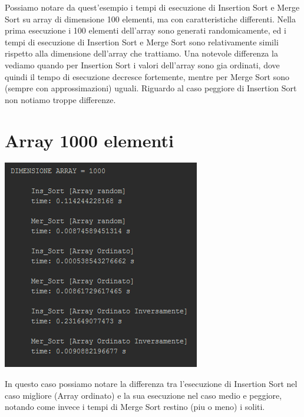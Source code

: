 \documentclass{article}
\begin{document}
Possiamo notare da quest'esempio i tempi di esecuzione di Insertion Sort e Merge Sort su array di dimensione 100 elementi, ma con caratteristiche differenti. Nella prima esecuzione i 100 elementi dell'array sono generati randomicamente, ed i tempi di esecuzione di Insertion Sort e Merge Sort sono relativamente simili rispetto alla dimensione dell'array che trattiamo. Una notevole differenza la vediamo quando per Insertion Sort i valori dell'array sono gia ordinati, dove quindi il tempo di esecuzione decresce fortemente, mentre per Merge Sort sono (sempre con approssimazioni) uguali. Riguardo al caso peggiore di Insertion Sort non notiamo troppe differenze.



\section{Array 1000 elementi}
\begin{center}
\includegraphics{photo1000.png}
\end{center}
In questo caso possiamo notare la differenza tra l'esecuzione di Insertion Sort nel caso migliore (Array ordinato) e la sua esecuzione nel caso medio e peggiore, notando come invece i tempi di Merge Sort restino (piu o meno) i soliti.
\end{document}
